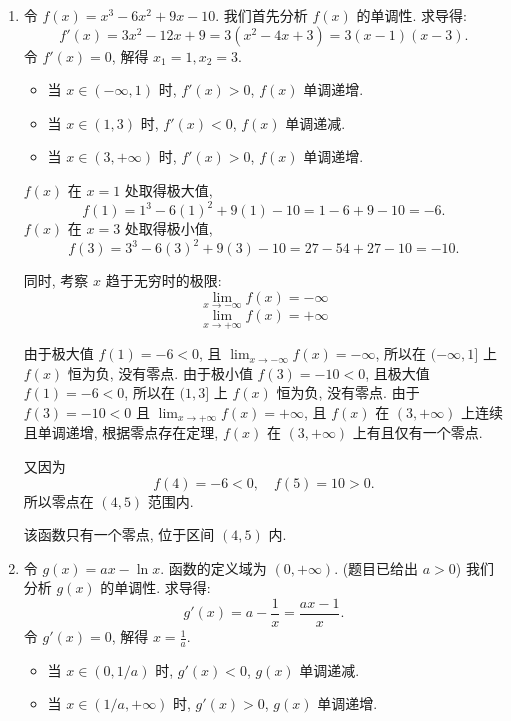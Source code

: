 \begin{solution}
    \begin{enumerate}
        \item
              令 $f(x) = x^3-6x^2+9x-10$.
              我们首先分析 $f(x)$ 的单调性. 求导得:
              $$ f'(x) = 3x^2 - 12x + 9 = 3(x^2 - 4x + 3) = 3(x-1)(x-3). $$
              令 $f'(x) = 0$, 解得 $x_1 = 1, x_2 = 3$.

              \begin{itemize}
                  \item 当 $x \in (-\infty, 1)$ 时, $f'(x) > 0$, $f(x)$ 单调递增.
                  \item 当 $x \in (1, 3)$ 时, $f'(x) < 0$, $f(x)$ 单调递减.
                  \item 当 $x \in (3, +\infty)$ 时, $f'(x) > 0$, $f(x)$ 单调递增.
              \end{itemize}

              $f(x)$ 在 $x=1$ 处取得极大值, $$f(1) = 1^3 - 6(1)^2 + 9(1) - 10 = 1 - 6 + 9 - 10 = -6.$$
              $f(x)$ 在 $x=3$ 处取得极小值, $$f(3) = 3^3 - 6(3)^2 + 9(3) - 10 = 27 - 54 + 27 - 10 = -10.$$

              同时, 考察 $x$ 趋于无穷时的极限:
              $$ \lim_{x \to -\infty} f(x) = -\infty $$
              $$ \lim_{x \to +\infty} f(x) = +\infty $$

              由于极大值 $f(1) = -6 < 0$, 且 $\lim_{x \to -\infty} f(x) = -\infty$, 所以在 $(-\infty, 1]$ 上 $f(x)$ 恒为负, 没有零点.
              由于极小值 $f(3) = -10 < 0$, 且极大值 $f(1) = -6 < 0$, 所以在 $(1, 3]$ 上 $f(x)$ 恒为负, 没有零点.
              由于 $f(3) = -10 < 0$ 且 $\lim_{x \to +\infty} f(x) = +\infty$, 且 $f(x)$ 在 $(3, +\infty)$ 上连续且单调递增, 根据零点存在定理, $f(x)$ 在 $(3, +\infty)$ 上有且仅有一个零点.

              又因为
              $$f(4) =  -6 < 0 ,\quad f(5) =  10 > 0 .$$
              所以零点在 $(4, 5)$ 范围内.

              该函数只有一个零点, 位于区间 $(4, 5)$ 内.

        \item
              令 $g(x) = ax - \ln x$. 函数的定义域为 $(0, +\infty)$. (题目已给出 $a>0$)
              我们分析 $g(x)$ 的单调性. 求导得:
              $$ g'(x) = a - \frac{1}{x} = \frac{ax - 1}{x}. $$
              令 $g'(x) = 0$, 解得 $x = \frac{1}{a}$.

              \begin{itemize}
                  \item 当 $x \in (0, 1/a)$ 时, $g'(x) < 0$, $g(x)$ 单调递减.
                  \item 当 $x \in (1/a, +\infty)$ 时, $g'(x) > 0$, $g(x)$ 单调递增.
              \end{itemize}


\end{enumerate}
\end{solution}
